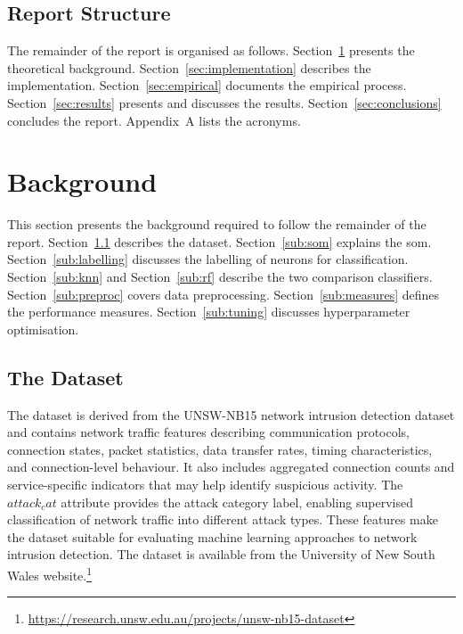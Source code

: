 \documentclass[conference]{IEEEtran}
\begin{document}
\subsection{Report Structure}
\label{sub:structure}

The remainder of the report is organised as follows.
Section~\ref{sec:background} presents the theoretical background.
Section~\ref{sec:implementation} describes the implementation.
Section~\ref{sec:empirical} documents the empirical process.
Section~\ref{sec:results} presents and discusses the results.
Section~\ref{sec:conclusions} concludes the report.
Appendix~A lists the acronyms.


\section{Background}
\label{sec:background}

This section presents the background required to follow the remainder of the report.
Section~\ref{sub:unsw} describes the dataset.
Section~\ref{sub:som} explains the \gls{som}.
Section~\ref{sub:labelling} discusses the labelling of neurons for classification.
Section~\ref{sub:knn} and Section~\ref{sub:rf} describe the two comparison classifiers.
Section~\ref{sub:preproc} covers data preprocessing.
Section~\ref{sub:measures} defines the performance measures.
Section~\ref{sub:tuning} discusses hyperparameter optimisation.

\subsection{The Dataset}
\label{sub:unsw}

The dataset is derived from the UNSW-NB15 network intrusion detection dataset
and contains network traffic features describing communication protocols,
connection states, packet statistics, data transfer rates, timing
characteristics, and connection-level behaviour. It also includes aggregated
connection counts and service-specific indicators that may help identify
suspicious activity. The $attack_cat$ attribute provides the attack category
label, enabling supervised classification of network traffic into different
attack types. These features make the dataset suitable for evaluating machine
learning approaches to network intrusion detection. The dataset is available
from the University of New South Wales website.\footnote{\url{https://research.unsw.edu.au/projects/unsw-nb15-dataset}}
\end{document}
